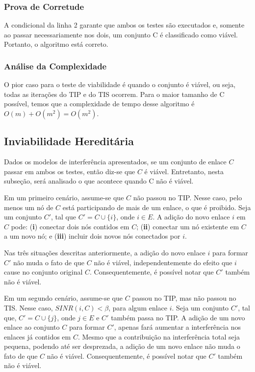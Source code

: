 \subsubsection{Prova de Corretude}

A condicional da linha 2 garante que ambos os testes são executados e, somente ao passar necessariamente nos dois, um conjunto C é classificado como viável. Portanto, o algoritmo está correto.

\subsubsection{Análise da Complexidade}

O pior caso para o teste de viabilidade é quando o conjunto é viável, ou seja, todas as iterações do TIP e do TIS ocorrem. Para o maior tamanho de C possível, temos que a complexidade de tempo desse algoritmo é $O(m)+O(m^2)=O(m^2)$.

\subsection{Inviabilidade Hereditária}

Dados os modelos de interferência apresentados, se um conjunto de enlace $C$ passar em ambos os testes, então diz-se que $C$ é viável. Entretanto, nesta subseção, será analisado o que acontece quando C não é viável.

Em um primeiro cenário, assume-se que $C$ não passou no TIP. Nesse caso, pelo menos um nó de $C$ está participando de mais de um enlace, o que é proibido. Seja um conjunto $C'$, tal que $C' = C \cup \{i\}$, onde $i \in E$. A adição do novo enlace $i$ em $C$ pode: ({\bf i}) conectar dois nós contidos em $C$; ({\bf ii}) conectar um nó existente em $C$ a um novo nó; e ({\bf iii}) incluir dois novos nós conectados por $i$. 
  
Nas três situações descritas anteriormente, a adição do novo enlace $i$ para formar $C'$ não muda o fato de que $C$ não é viável, independentemente do efeito que $i$ cause no conjunto original $C$. Consequentemente, é possível notar que $C'$ também não é viável.

Em um segundo cenário, assume-se que $C$ passou no TIP, mas não passou no TIS. Nesse caso, $SINR(i,C) < \beta$, para algum enlace $i$. Seja um conjunto $C'$, tal que, $C' = C \cup \{j\}$, onde $j \in E$ e $C'$ também passa no TIP. A adição de um novo enlace ao conjunto $C$ para formar $C'$, apenas fará aumentar a interferência nos enlaces já contidos em $C$. Mesmo que a contribuição na interferência total seja pequena, podendo até ser desprezada, a adição de um novo enlace não muda o fato de que $C$ não é viável. Consequentemente, é possível notar que $C'$ também não é viável.

